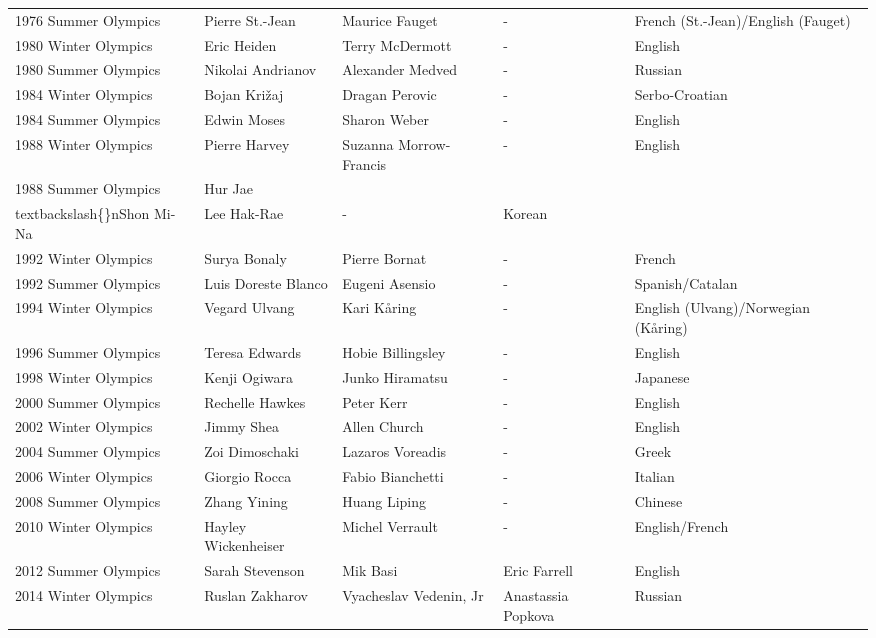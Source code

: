 \documentclass{article}
\begin{document}
\begin{tabular}{lllll}
1976 Summer Olympics & Pierre St.-Jean & Maurice Fauget & - & French (St.-Jean)/English (Fauget) \\
1980 Winter Olympics & Eric Heiden & Terry McDermott & - & English \\
1980 Summer Olympics & Nikolai Andrianov & Alexander Medved & - & Russian \\
1984 Winter Olympics & Bojan Križaj & Dragan Perovic & - & Serbo-Croatian \\
1984 Summer Olympics & Edwin Moses & Sharon Weber & - & English \\
1988 Winter Olympics & Pierre Harvey & Suzanna Morrow-Francis & - & English \\
1988 Summer Olympics & Hur Jae\\textbackslash\{\}nShon Mi-Na & Lee Hak-Rae & - & Korean \\
1992 Winter Olympics & Surya Bonaly & Pierre Bornat & - & French \\
1992 Summer Olympics & Luis Doreste Blanco & Eugeni Asensio & - & Spanish/Catalan \\
1994 Winter Olympics & Vegard Ulvang & Kari Kåring & - & English (Ulvang)/Norwegian (Kåring) \\
1996 Summer Olympics & Teresa Edwards & Hobie Billingsley & - & English \\
1998 Winter Olympics & Kenji Ogiwara & Junko Hiramatsu & - & Japanese \\
2000 Summer Olympics & Rechelle Hawkes & Peter Kerr & - & English \\
2002 Winter Olympics & Jimmy Shea & Allen Church & - & English \\
2004 Summer Olympics & Zoi Dimoschaki & Lazaros Voreadis & - & Greek \\
2006 Winter Olympics & Giorgio Rocca & Fabio Bianchetti & - & Italian \\
2008 Summer Olympics & Zhang Yining & Huang Liping & - & Chinese \\
2010 Winter Olympics & Hayley Wickenheiser & Michel Verrault & - & English/French \\
2012 Summer Olympics & Sarah Stevenson & Mik Basi & Eric Farrell & English \\
2014 Winter Olympics & Ruslan Zakharov & Vyacheslav Vedenin, Jr & Anastassia Popkova & Russian \\
\bottomrule
\end{tabular}
\end{document}

